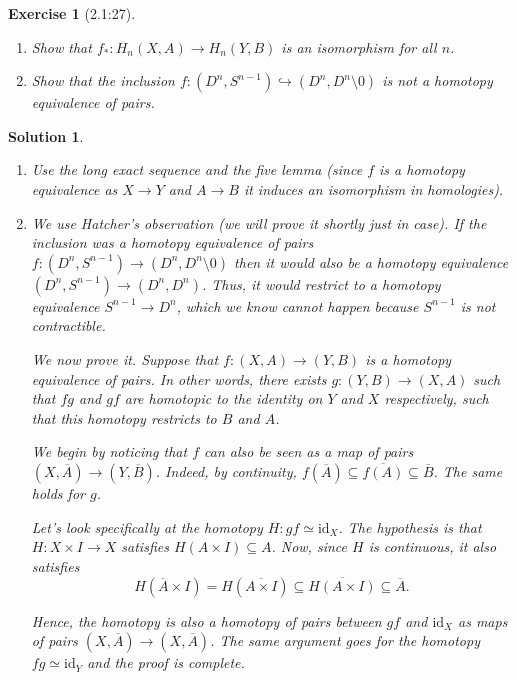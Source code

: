 \documentclass{article}
\theoremstyle{plain}
\newtheorem*{ex}{Exercise}
\theoremstyle{nonumberplain}
\newtheorem{sol}{Solution}
\newcommand{\id}{\mathrm{id}}
\newcommand{\close}[1]{\overline{#1}}
\begin{document}
\begin{ex}[2.1:27]
\leavevmode
\begin{enumerate}
\item Show that $f_* \colon H_n(X,A) \to H_n(Y,B)$ is an isomorphism for all $n$.
\item Show that the inclusion $f \colon (D^n, S^{n-1}) \hookrightarrow (D^n, D^n \setminus 0)$ is not a homotopy equivalence of pairs.
\end{enumerate}
\end{ex}

\begin{sol}
\leavevmode
\begin{enumerate}
\item Use the long exact sequence and the five lemma (since $f$ is a homotopy equivalence as $X \to Y$ and $A \to B$ it induces an isomorphism in homologies).
\item We use Hatcher's observation (we will prove it shortly just in case).  If the inclusion was a homotopy equivalence of pairs $f \colon (D^n, S^{n-1}) \to (D^n, D^n \setminus 0)$ then it would also be a homotopy equivalence $(D^n, S^{n-1}) \to (D^n, D^n)$. Thus, it would restrict to a homotopy equivalence $S^{n-1} \to D^n$, which we know cannot happen because $S^{n-1}$ is not contractible.

We now prove it. Suppose that $f \colon (X,A) \to (Y,B)$ is a homotopy equivalence of pairs. In other words, there exists $g \colon (Y,B) \to (X,A)$ such that $fg$ and $gf$ are homotopic to the identity on $Y$ and $X$ respectively, such that this homotopy restricts to $B$ and $A$.

We begin by noticing that $f$ can also be seen as a map of pairs $(X, \close A) \to (Y, \close B)$. Indeed, by continuity, $f(\close A) \subseteq \close{f(A)} \subseteq \close B$. The same holds for $g$.

Let's look specifically at the homotopy $H \colon gf \simeq \id_X$. The hypothesis is that $H \colon X \times I \to X$ satisfies $H(A \times I) \subseteq A$. Now, since $H$ is continuous, it also satisfies
\begin{equation}
H(\close A \times I) = H(\close{A \times I}) \subseteq \close{H(A \times I)} \subseteq \close A.
\end{equation}

Hence, the homotopy is also a homotopy of pairs between $gf$ and $\id_X$ as maps of pairs $(X,\close A) \to (X,\close A)$. The same argument goes for the homotopy $fg \simeq \id_Y$ and the proof is complete.
\end{enumerate}
\end{sol}
\end{document}
